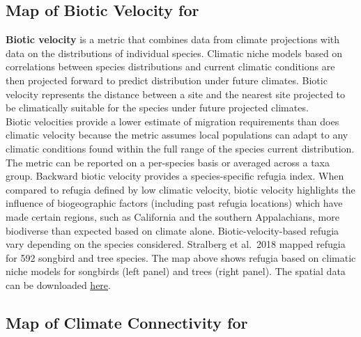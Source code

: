 \documentclass[
]{article}
\begin{document}
\pagebreak

\hypertarget{map-of-biotic-velocity-for}{%
\subsection{Map of Biotic Velocity
for}\label{map-of-biotic-velocity-for}}

\textbf{Biotic velocity} is a metric that combines data from climate
projections with data on the distributions of individual species.
Climatic niche models based on correlations between species
distributions and current climatic conditions are then projected forward
to predict distribution under future climates. Biotic velocity
represents the distance between a site and the nearest site projected to
be climatically suitable for the species under future projected
climates.\\
Biotic velocities provide a lower estimate of migration requirements
than does climatic velocity because the metric assumes local populations
can adapt to any climatic conditions found within the full range of the
species current distribution. The metric can be reported on a
per-species basis or averaged across a taxa group. Backward biotic
velocity provides a species-specific refugia index. When compared to
refugia defined by low climatic velocity, biotic velocity highlights the
influence of biogeographic factors (including past refugia locations)
which have made certain regions, such as California and the southern
Appalachians, more biodiverse than expected based on climate alone.
Biotic-velocity-based refugia vary depending on the species considered.
Stralberg et al.~2018 mapped refugia for 592 songbird and tree species.
The map above shows refugia based on climatic niche models for songbirds
(left panel) and trees (right panel). The spatial data can be downloaded
\href{https://adaptwest.databasin.org/pages/climatic-macrorefugia-for-trees-and-songbirds}{here}.

\pagebreak

\hypertarget{map-of-climate-connectivity-for}{%
\subsection{Map of Climate Connectivity
for}\label{map-of-climate-connectivity-for}}
\end{document}
